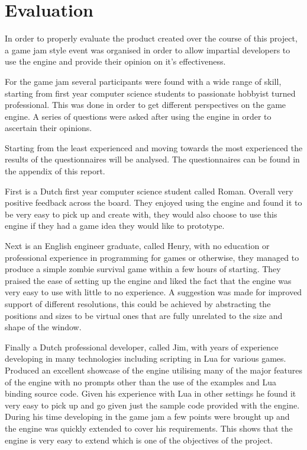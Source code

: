 \documentclass[11pt,a4paper,titlepage]{report}
\begin{document}
\chapter{Evaluation}


	In order to properly evaluate the product created over the course of this project, a game jam style event was organised in order to allow impartial developers to use the engine and provide their opinion on it's effectiveness.
	

	For the game jam several participants were found with a wide range of skill, starting from first year computer science students to passionate hobbyist turned professional. This was done in order to get different perspectives on the game engine. A series of questions were asked after using the engine in order to ascertain their opinions.

	Starting from the least experienced and moving towards the most experienced the results of the questionnaires will be analysed. The questionnaires can be found in the appendix of this report.

	First is a Dutch first year computer science student called Roman. Overall very positive feedback across the board. They enjoyed using the engine and found it to be very easy to pick up and create with, they would also choose to use this engine if they had a game idea they would like to prototype.

	Next is an English engineer graduate, called Henry, with no education or professional experience in programming for games or otherwise, they managed to produce a simple zombie survival game within a few hours of starting. They praised the ease of setting up the engine and liked the fact that the engine was very easy to use with little to no experience. A suggestion was made for improved support of different resolutions, this could be achieved by abstracting the positions and sizes to be virtual ones that are fully unrelated to the size and shape of the window.

	Finally a Dutch professional developer, called Jim, with years of experience developing in many technologies including scripting in Lua for various games. Produced an excellent showcase of the engine utilising many of the major features of the engine with no prompts other than the use of the examples and Lua binding source code. Given his experience with Lua in other settings he found it very easy to pick up and go given just the sample code provided with the engine. During his time developing in the game jam a few points were brought up and the engine was quickly extended to cover his requirements. This shows that the engine is very easy to extend which is one of the objectives of the project.
\end{document}
